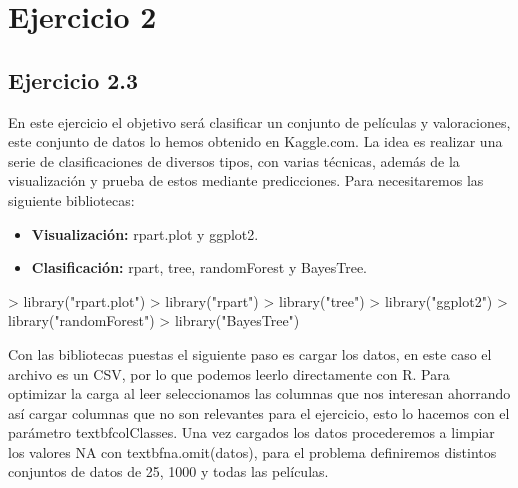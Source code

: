 \documentclass[a4paper]{article}
\begin{document}
\section{Ejercicio 2}
\subsection{Ejercicio 2.3} 
En este ejercicio el objetivo será clasificar un conjunto de películas y valoraciones, este conjunto de datos lo hemos obtenido en Kaggle.com. 
La idea es realizar una serie de clasificaciones de diversos tipos, con varias técnicas, además de la visualización y prueba de estos mediante predicciones. Para necesitaremos las siguiente bibliotecas: 
\begin{itemize}
	\item \textbf{Visualización:} rpart.plot y ggplot2.
	\item \textbf{Clasificación:} rpart, tree, randomForest y BayesTree.
\end{itemize}
\begin{Schunk}
\begin{Sinput}
> library("rpart.plot")
> library("rpart")  
> library("tree")  
> library("ggplot2")
> library("randomForest") 
> library("BayesTree")  
\end{Sinput}
\end{Schunk}
Con las bibliotecas puestas el siguiente paso es cargar los datos, en este caso el archivo es un CSV, por lo que podemos leerlo directamente con R. Para optimizar la carga al leer seleccionamos las columnas que nos interesan ahorrando así cargar columnas que no son relevantes para el ejercicio, esto lo hacemos con el parámetro textbf{colClasses}. Una vez cargados los datos procederemos a limpiar los valores NA con textbf{na.omit(datos)}, para el problema definiremos distintos conjuntos de datos de 25, 1000 y todas las películas.
\end{document}
